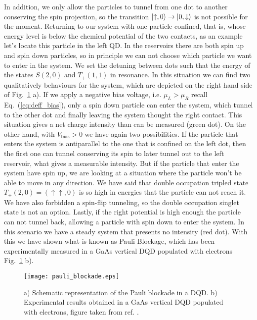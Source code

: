 In addition, we only allow the particles to tunnel from one dot to another conserving the spin projection, so the transition $\ket{\uparrow,0}\rightarrow\ket{0,\downarrow}$ is not possible for the moment. Returning to our system with one particle confined, that is, whose energy level is below the chemical potential of the two contacts, as an example let's locate this particle in the left QD. In the reservoirs there are both spin up and spin down particles, so in principle we can not choose which particle we want to enter in the system. We set the detuning between dots such that the energy of the states $S(2,0)$ and $T_+(1,1)$ in resonance. In this situation we can find two qualitatively behaviours for the system, which are depicted on the right hand side of Fig.~\ref{fig:pauli_blockade} a). If we apply a negative bias voltage, i.e. $\mu_L>\mu_R$ recall Eq.~(\ref{eq:deff_bias}), only a spin down particle can enter the system, which tunnel to the other dot and finally leaving the system thought the right contact. This situation gives a net charge intensity than can be measured (green dot). On the other hand, with $V_{\text{bias}}>0$ we have again two possibilities. If the particle that enters the system is antiparallel to the one that is confined on the left dot, then the first one can tunnel conserving its spin to later tunnel out to the left reservoir, what gives a measurable intensity. But if the particle that enter the system have spin up,  we are looking at a situation where the particle won't be able to move in any direction. We have said that double occupation tripled state $T_+(2,0)=(\uparrow\uparrow,0)$ is so high in energies that the particle can not reach it. We have also forbidden a spin-flip tunneling, so the double occupation singlet state is not an option. Lastly, if the right potential is high enough the particle can not tunnel back, allowing a particle with spin down to enter the system. In this scenario we have a steady system that presents no intensity (red dot). With this we have shown what is known as Pauli Blockage, which has been experimentally measured in a GaAs vertical DQD populated with electrons Fig.~\ref{fig:pauli_blockade} b).\\
\begin{figure}[!htb]
	\centering
	\texttt{[image: pauli\_blockade.eps]}
	\caption{a) Schematic representation of the Pauli blockade in a DQD. b) Experimental results obtained in a GaAs vertical DQD populated with electrons, figure taken from ref. \cite{Ono2002}.}
	\label{fig:pauli_blockade}
\end{figure}

